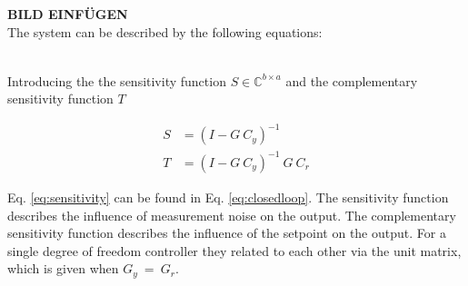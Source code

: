 \textbf{BILD EINFÜGEN} \\

The system can be described by the following equations:

\begin{align}
\label{eq:closedloop}
\end{align}

Introducing the the sensitivity function $S \in \mathbb{C}^{b \times a}$ and the complementary sensitivity function $T$

\begin{align}
\label{eq:sensitivity}
S & = \left( I - G~C_y\right)^{-1} \\
T & = \left( I - G~C_y \right)^{-1} ~G~C_r
\end{align}

Eq. \ref{eq:sensitivity} can be found in Eq. \ref{eq:closedloop}. The sensitivity function describes the influence of measurement noise on the output. The complementary sensitivity function describes the influence of the setpoint on the output. For a single degree of freedom controller they related to each other via the unit matrix, which is given when $G_y ~=~ G_r$. 